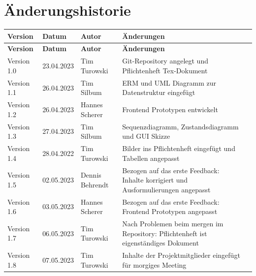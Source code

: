 



\maketitle

\newpage
\section{Änderungshistorie}

\begin{flushleft}
		\begin{longtable}{p{2cm}p{2cm}p{3cm}p{9cm}c}
            \toprule
            \textbf{Version} & \textbf{Datum} & \textbf{Autor} & \textbf{Änderungen}\\
            \midrule\endfirsthead
            \toprule
            \textbf{Version} & \textbf{Datum} & \textbf{Autor} & \textbf{Änderungen}\\
            \midrule\endhead
            	Version 1.0 & 23.04.2023 & Tim Turowski & Git-Repository angelegt und Pflichtenheft Tex-Dokument \\ \midrule
				Version 1.1 & 26.04.2023 & Tim Silbum & ERM und UML Diagramm zur Datenstruktur eingefügt \\ \midrule
				Version 1.2 & 26.04.2023 & Hannes Scherer & Frontend Prototypen entwickelt \\ \midrule
				Version 1.3 & 27.04.2023 & Tim Silbum & Sequenzdiagramm, Zustandsdiagramm und GUI Skizze \\ \midrule
 				Version 1.4 & 28.04.2022 & Tim Turowski & Bilder ins Pflichtenheft eingefügt und Tabellen angepasst \\ \midrule
				Version 1.5 & 02.05.2023 & Dennis Behrendt & Bezogen auf das erste Feedback: Inhalte korrigiert und Ausformulierungen angepasst \\ \midrule
				Version 1.6 & 03.05.2023 & Hannes Scherer & Bezogen auf das erste Feedback: Frontend Prototypen angepasst \\ \midrule
				Version 1.7 & 06.05.2023 & Tim Turowski & Nach Problemen beim mergen im Repository: Pflichtenheft ist eigenständiges Dokument \\ \midrule
				Version 1.8 & 07.05.2023 & Tim Turowski & Inhalte der Projektmitglieder eingefügt für morgiges Meeting \\ 
            \bottomrule
    \end{longtable}
    ~\vspace{-23pt}
\end{flushleft}

